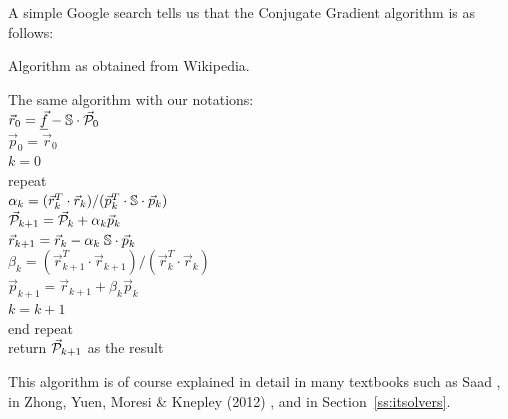 A simple Google search tells us that the Conjugate Gradient algorithm is as follows:

\begin{minipage}{0.40\textwidth}
\centering
{\captionfont Algorithm as obtained from Wikipedia.}\\
\end{minipage}\hfill
\begin{minipage}{0.50\textwidth}
The same algorithm with our notations:\\
$\vec{r}_0 = \underline{\vec{f}} - {\mathbb{S}} \cdot \vec{\cal P}_0$\\
$\vec{p}_0 = \vec{r}_0$\\
$k=0$ \\
repeat\\
\hspace{8mm} $\alpha_k = (\vec{r}_k^T\cdot \vec{r}_k )/(\vec{p}_k^T \cdot {\mathbb{S}}\cdot  \vec{p}_k )$\\
\hspace{8mm} $\vec{\cal P}_{k+1} = \vec{\cal P}_k+\alpha_k \vec{p}_k$\\
\hspace{8mm} $\vec{r}_{k+1} = \vec{r}_k - \alpha_k \; {\mathbb{S}} \cdot \vec{p}_k $ \\
\hspace{8mm} $\beta_k=(\vec{r}_{k+1}^T \cdot \vec{r}_{k+1})/(\vec{r}_k^T \cdot \vec{r}_k)$ \\
\hspace{8mm} $\vec{p}_{k+1} =\vec{r}_{k+1}+ \beta_k \vec{p}_k$ \\
$k=k+1$ \\
end repeat\\
return $\vec{\cal P}_{k+1}$ as the result
\end{minipage}

\vspace{.5cm}

This algorithm is of course explained in detail in many textbooks such as Saad \cite{saad},
in Zhong, Yuen, Moresi \& Knepley (2012) \cite{zhym12}, and in Section~\ref{ss:itsolvers}.

